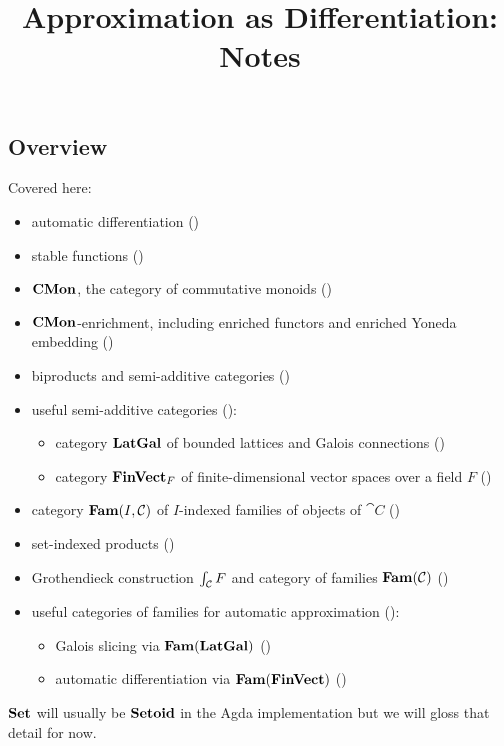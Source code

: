 \documentclass[acmsmall,screen]{acmart}
\begin{document}
\title{Approximation as Differentiation: Notes}

\maketitle

\subsection{Overview}

Covered here:
\begin{itemize}
\item automatic differentiation ()
\item stable functions ()
\item $\mathbf{CMon}$, the category of commutative monoids ()
\item $\mathbf{CMon}$-enrichment, including enriched functors and enriched Yoneda embedding ()
\item biproducts and semi-additive categories ()
\item useful semi-additive categories ():
   \begin{itemize}
   \item category $\mathbf{LatGal}$ of bounded lattices and Galois connections ()
   \item category $\mathbf{FinVect}_F$ of finite-dimensional vector spaces over a field $F$
   ()
   \end{itemize}
\item category $\mathbf{Fam}(I,\mathcal{C})$ of $I$-indexed families of objects of $\cat{C}$ ()
\item set-indexed products ()
\item Grothendieck construction $\int_{\mathcal{C}}F$ and category of families $\mathbf{Fam}(\mathcal{C})$
()
\item useful categories of families for automatic approximation
():
   \begin{itemize}
      \item Galois slicing via $\mathbf{Fam}(\mathbf{LatGal})$ ()
      \item automatic differentiation via $\mathbf{Fam}(\mathbf{FinVect})$ ()
   \end{itemize}
\end{itemize}

\noindent $\mathbf{Set}$ will usually be $\mathbf{Setoid}$ in the Agda implementation but we will gloss that detail for now.

















\end{document}
